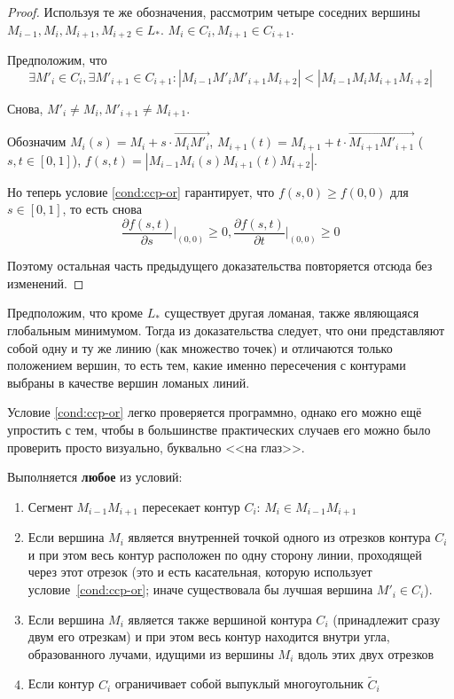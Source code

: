 \begin{proof}
Используя те же обозначения,
рассмотрим четыре соседних вершины
$M_{i-1}, M_i, M_{i+1}, M_{i+2} \in L_*$.
$M_i \in  C_i,
M_{i+1} \in C_{i+1}$.

Предположим, что
$$
\exists M'_i \in C_i,
\exists M'_{i+1} \in C_{i+1}:
|M_{i-1} M'_i M'_{i+1} M_{i+2}|
<
|M_{i-1} M_i M_{i+1} M_{i+2}|
$$

Снова,
$
M'_i \ne M_i,
M'_{i+1} \ne M_{i+1}
$.

Обозначим
$
M_i(s)=M_i+s \cdot \overrightarrow{M_i M'_i}
$,
$
  M_{i+1}(t)= M_{i+1}+t \cdot \overrightarrow{M_{i+1} M'_{i+1}}
$
($s,t \in[0,1]$),
$f(s,t)=
|M_{i-1} M_i(s) M_{i+1}(t) M_{i+2}|
$.

Но теперь условие
\ref{cond:ccp-or}
гарантирует, что
$f(s,0)\geqslant f(0,0)$
для
$s\in[0,1]$,
то есть снова
\begin{equation}
  \frac{\partial f(s,t)}{\partial s} \Big|_{(0,0)} \geqslant 0,
  \frac{\partial f(s,t)}{\partial t} \Big|_{(0,0)} \geqslant 0
\end{equation}

Поэтому остальная часть предыдущего доказательства
повторяется отсюда без изменений.
\end{proof}

Предположим,
что кроме
$L_*$
существует другая ломаная,
также являющаяся глобальным минимумом.
Тогда из доказательства следует,
что они представляют собой одну и ту же
линию
(как множество точек)
и отличаются только положением вершин,
то есть тем, какие именно пересечения
с контурами
выбраны в качестве вершин ломаных линий.

Условие \ref{cond:ccp-or}
легко проверяется программно,
однако его можно ещё упростить с тем,
чтобы в большинстве практических случаев
его можно было проверить просто визуально,
буквально <<на глаз>>.

\begin{condition}
  \label{cond:ccp-four}
  Выполняется \textbf{любое} из условий:
  \begin{enumerate}
    \item
    Сегмент
    $M_{i-1} M_{i+1}$
    пересекает контур
    $C_i$:
    $M_i \in M_{i-1} M_{i+1}$
    \item
    Если вершина
    $M_i$
    является внутренней точкой одного из
    отрезков контура
    $C_i$
    и при этом весь контур расположен
    по одну сторону линии,
    проходящей через этот отрезок
    (это и есть касательная,
    которую использует условие~\ref{cond:ccp-or};
    иначе существовала бы лучшая вершина
    $M'_i\in C_i$).
    \item
    Если вершина
    $M_i$
    является также вершиной контура
    $C_i$
    (принадлежит сразу двум его отрезкам)
    и при этом весь контур находится
    внутри угла,
    образованного лучами,
    идущими из вершины
    $M_i$
    вдоль этих двух отрезков
    \item
    Если контур
    $C_i$
    ограничивает собой выпуклый
    многоугольник
    $\widetilde C_i$
  \end{enumerate}
\end{condition}

